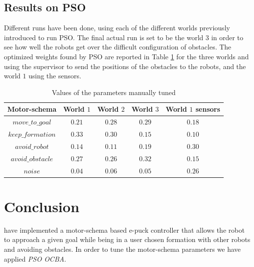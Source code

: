 \documentclass[journal]{IEEEtran}
\begin{document}
\subsection{Results on PSO}
Different runs have been done, using each of the different worlds previously introduced to run PSO. The final actual run is set to be the world $3$ in order to see how well the robots get over the difficult configuration of obstacles. The optimized weights found by PSO are reported in Table \ref{weights} for the three worlds and using the supervisor to send the positions of the obstacles to the robots, and the world $1$ using the sensors. 
\begin{table}
\begin{center}
\begin{tabular}{|c|c|c|c|c|}
  \hline
  Motor-schema & World $1$ & World $2$ & World $3$ & World $1$ sensors \\
  \hline
  $move\_to\_goal$ &  $0.21$ & $0.28$ & $0.29$ & $0.18$\\
  $keep\_formation$ & $0.33$ & $0.30$ & $0.15$ & $0.10$\\
  $avoid\_robot$ & $0.14$ & $0.11$ & $0.19$ & $0.30$\\
  $avoid\_obstacle$ & $0.27$ & $0.26$ & $0.32$ & $0.15$\\
  $noise$ & $0.04$ & $0.06$ & $0.05$ & $0.26$\\
  \hline
\end{tabular}
\caption{Values of the parameters manually tuned} \label{weights}
\end{center} 
\end{table}


\section{Conclusion}

 have implemented a motor-schema based e-puck controller that
allows the robot to approach a given goal while being in a user chosen formation with
other robots and avoiding obstacles. In order to tune the motor-schema parameters we 
have applied \textit{PSO OCBA}. 





\end{document}
